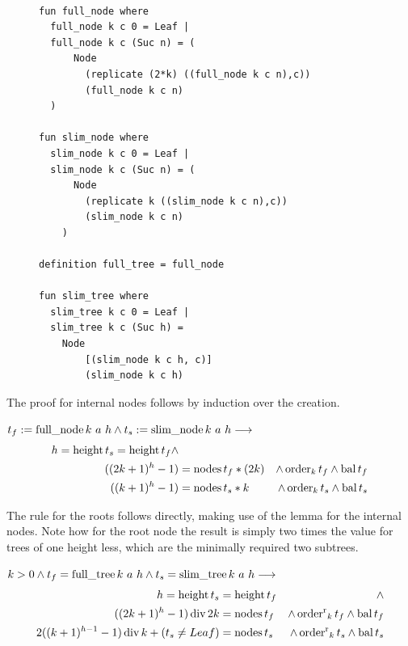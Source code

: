\begin{figure}
\begin{lstlisting}[mathescape=true, language=Isabelle,label={lst:sharp-trees-def},
    caption={The functions generating trees with minimal size and maximal size for given height.}]

fun full_node where
  full_node k c 0 = Leaf |
  full_node k c (Suc n) = (
      Node
        (replicate (2*k) ((full_node k c n),c))
        (full_node k c n)
  )

fun slim_node where
  slim_node k c 0 = Leaf |
  slim_node k c (Suc n) = (
      Node
        (replicate k ((slim_node k c n),c))
        (slim_node k c n)
    )

definition full_tree = full_node

fun slim_tree where
  slim_tree k c 0 = Leaf |
  slim_tree k c (Suc h) =
    Node
        [(slim_node k c h, c)]
        (slim_node k c h)

\end{lstlisting}
\end{figure}

The proof for internal nodes follows by induction over the creation.

\begin{lemma} $t_f := \operatorname{full\_node} k\ a\ h \wedge t_s := \operatorname{slim\_node} k\ a\ h \longrightarrow$
    \begin{align}
    h = \operatorname{height} t_s = \operatorname{height} t_f \wedge \\
    ((2k+1)^h - 1) &= \operatorname{nodes} t_f * (2k) &\wedge \operatorname{order}_k t_f \wedge \operatorname{bal} t_f \\ 
    ((k+1)^h - 1) &= \operatorname{nodes} t_s * k  &\wedge \operatorname{order}_k t_s \wedge \operatorname{bal} t_s
    \end{align}
\end{lemma}

The rule for the roots follows directly, making use of the lemma
for the internal nodes.
Note how for the root node the result is simply two times the
value for trees of one height less, which are the minimally
required two subtrees.

\begin{theorem}
    $k > 0 \wedge t_f = \operatorname{full\_tree} k\ a\ h \wedge t_s = \operatorname{slim\_tree} k\ a\ h \longrightarrow$
    \begin{align*}
    h = \operatorname{height} t_s &= \operatorname{height} t_f &\wedge \\
        ((2k+1)^h - 1) \operatorname{div} 2k &= \operatorname{nodes} t_f &\wedge \operatorname{order^r}_k t_f \wedge \operatorname{bal} t_f \\ 
        2((k+1)^{h-1} - 1) \operatorname{div} k + (t_s \neq Leaf) &= \operatorname{nodes} t_s &\wedge \operatorname{order^r}_k t_s \wedge \operatorname{bal} t_s
    \end{align*}
\end{theorem}


